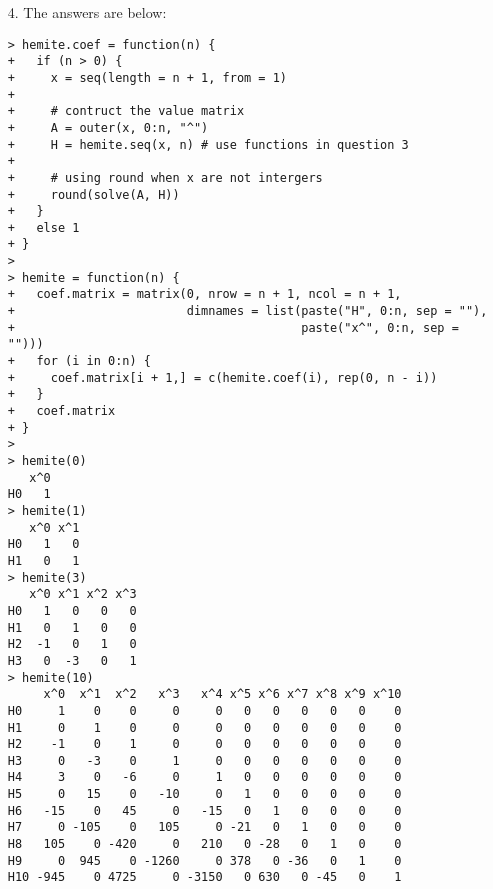 \documentclass[11pt]{report}
\theoremstyle{definition}
\theoremstyle{remark}
\begin{document}
\begin{enumerate}
\begin{enumerate}
    \end{enumerate}
    \item[4.] The answers are below:
    \begin{verbatim}> hemite.coef = function(n) {
+   if (n > 0) {
+     x = seq(length = n + 1, from = 1)
+
+     # contruct the value matrix
+     A = outer(x, 0:n, "^")
+     H = hemite.seq(x, n) # use functions in question 3
+
+     # using round when x are not intergers
+     round(solve(A, H))
+   }
+   else 1
+ }
>
> hemite = function(n) {
+   coef.matrix = matrix(0, nrow = n + 1, ncol = n + 1,
+                        dimnames = list(paste("H", 0:n, sep = ""),
+                                        paste("x^", 0:n, sep = "")))
+   for (i in 0:n) {
+     coef.matrix[i + 1,] = c(hemite.coef(i), rep(0, n - i))
+   }
+   coef.matrix
+ }
>
> hemite(0)
   x^0
H0   1
> hemite(1)
   x^0 x^1
H0   1   0
H1   0   1
> hemite(3)
   x^0 x^1 x^2 x^3
H0   1   0   0   0
H1   0   1   0   0
H2  -1   0   1   0
H3   0  -3   0   1
> hemite(10)
     x^0  x^1  x^2   x^3   x^4 x^5 x^6 x^7 x^8 x^9 x^10
H0     1    0    0     0     0   0   0   0   0   0    0
H1     0    1    0     0     0   0   0   0   0   0    0
H2    -1    0    1     0     0   0   0   0   0   0    0
H3     0   -3    0     1     0   0   0   0   0   0    0
H4     3    0   -6     0     1   0   0   0   0   0    0
H5     0   15    0   -10     0   1   0   0   0   0    0
H6   -15    0   45     0   -15   0   1   0   0   0    0
H7     0 -105    0   105     0 -21   0   1   0   0    0
H8   105    0 -420     0   210   0 -28   0   1   0    0
H9     0  945    0 -1260     0 378   0 -36   0   1    0
H10 -945    0 4725     0 -3150   0 630   0 -45   0    1\end{verbatim}


\end{enumerate}
\end{document}
